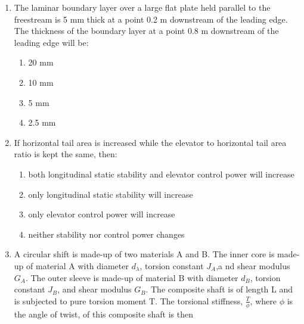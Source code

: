 \documentclass[journal]{IEEEtran}
\numberwithin{equation}{enumi}
\numberwithin{figure}{enumi}
\begin{document}
\begin{enumerate}[start=35]
    \item The laminar boundary layer over a large flat plate held parallel to the freestream is 5 mm thick at a point 0.2 m downstream of the leading edge. The thickness of the boundary layer at a point 0.8 m downstream of the leading edge will be:
    \begin{enumerate}
        \item 20 mm
        \item 10 mm
        \item 5 mm
        \item 2.5 mm
    \end{enumerate}

    \item If horizontal tail area is increased while the elevator to horizontal tail area ratio is kept the same, then:
    \begin{enumerate}
        \item both longitudinal static stability and elevator control power will increase
        \item only longitudinal static stability will increase
        \item only elevator control power will increase
        \item neither stability nor control power changes
    \end{enumerate}
\newpage
    \item A circular shift is made-up of two materials A and B. The inner core is made-up of material A with diameter $d_\lambda$, torsion constant $J_A$,a nd shear modulus $G_A$. The outer sleeve is made-up of material B with diameter $d_B$, torsion constant $J_B$, and shear modulus $G_B$. The composite shaft is of length L and is subjected to pure torsion moment T. The torsional stiffness, $\frac{T}{\phi}$, where $\phi$ is the angle of twist, of this composite shaft is then
\end{enumerate}
\end{document}
